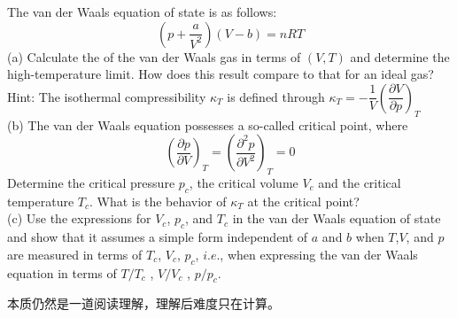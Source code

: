    \begin{solution}
    	The van der Waals equation of state is as follows:
    	\begin{equation*}
    		(p+\frac{a}{V^{2}})(V-b)=nRT
    	\end{equation*}
    	(a) Calculate the  of the van der Waals gas in terms of $(V,T)$ and
    	determine the high-temperature limit. How does this result compare to that for an ideal gas?\\
    	Hint: The isothermal compressibility $\kappa_T$ is defined through $\kappa_{T}=-\dfrac{1}{V}\left(\dfrac{\partial V}{\partial p}\right)_{T}$\\
    	(b) The van der Waals equation possesses a so-called critical point, where
    	\begin{equation*}
    		\left(\frac{\partial p}{\partial V}\right)_{T} = \left(\frac{\partial^{2} p}{\partial V^{2}}\right)_{T} = 0
    	\end{equation*}
    	Determine the critical pressure $p_c$, the critical volume $V_c$ and the critical temperature $T_c$. What
    	is the behavior of $\kappa_T$ at the critical point?\\
    	(c) Use the expressions for $V_c$, $p_c$, and $T_c$ in the van der Waals equation of state and show that it
    	assumes a simple form independent of $a$ and $b$ when $T$,$V$, and $p$ are measured in terms of $T_c$,
    	$V_c$, $p_c$, $i.e.$, when expressing the van der Waals equation in terms of $T/T_c$ , $V/V_c$ , $p/p_c$.
    	
    	\tcbrule
    	
        本质仍然是一道阅读理解，理解后难度只在计算。


\end{solution}
